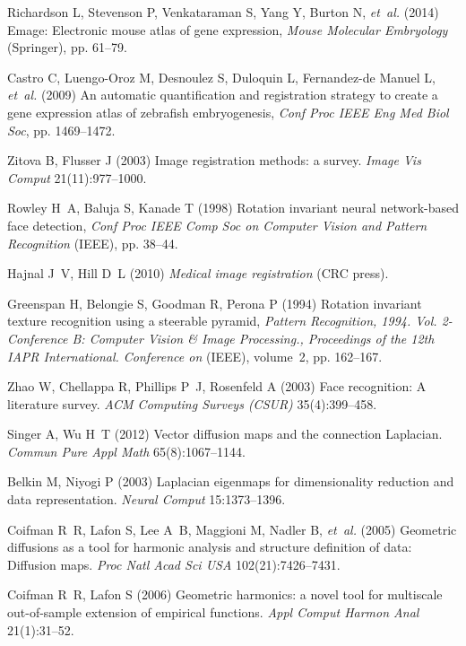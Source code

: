 \documentclass{pnastwo}
\begin{document}
\begin{article}
\begin{thebibliography}{10}
Richardson L, Stevenson P, Venkataraman S, Yang Y, Burton N, \textit{et~al.}
  (2014) Emage: Electronic mouse atlas of gene expression, \textit{Mouse
  Molecular Embryology} (Springer), pp. 61--79.

Castro C, Luengo-Oroz M, Desnoulez S, Duloquin L, Fernandez-de Manuel L,
  \textit{et~al.} (2009) An automatic quantification and registration strategy
  to create a gene expression atlas of zebrafish embryogenesis,
  \textit{Conf Proc IEEE Eng Med Biol Soc}, pp. 1469--1472.

Zitova B, Flusser J (2003) Image registration methods: a survey. \textit{Image
   Vis Comput} 21(11):977--1000.

Rowley H~A, Baluja S, Kanade T (1998) Rotation invariant neural network-based
  face detection, \textit{Conf Proc IEEE Comp Soc on Computer Vision and Pattern Recognition} (IEEE), pp. 38--44.

Hajnal J~V, Hill D~L (2010) \textit{Medical image registration} (CRC press).

Greenspan H, Belongie S, Goodman R, Perona P (1994) Rotation invariant texture
  recognition using a steerable pyramid, \textit{Pattern Recognition, 1994.
  Vol. 2-Conference B: Computer Vision \& Image Processing., Proceedings of the
  12th IAPR International. Conference on} (IEEE), volume~2, pp. 162--167.

Zhao W, Chellappa R, Phillips P~J, Rosenfeld A (2003) Face recognition: A
  literature survey. \textit{ACM Computing Surveys (CSUR)} 35(4):399--458.

Singer A, Wu H~T (2012) Vector diffusion maps and the connection {L}aplacian.
  \textit{Commun Pure Appl Math} 65(8):1067--1144.

Belkin M, Niyogi P (2003) Laplacian eigenmaps for dimensionality reduction and
  data representation. \textit{Neural Comput} 15:1373--1396.

Coifman R~R, Lafon S, Lee A~B, Maggioni M, Nadler B, \textit{et~al.} (2005)
  Geometric diffusions as a tool for harmonic analysis and structure definition
  of data: Diffusion maps. \textit{Proc Natl Acad Sci USA} 102(21):7426--7431.

Coifman R~R, Lafon S (2006) Geometric harmonics: a novel tool for multiscale
  out-of-sample extension of empirical functions. \textit{Appl Comput Harmon Anal} 21(1):31--52.


\end{thebibliography}
\end{article}
\end{document}
